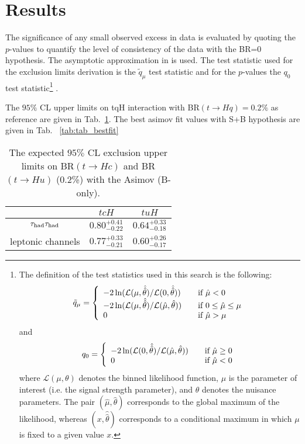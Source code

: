 \section{Results}
\label{sec:results}

The significance of any small observed excess in data is evaluated by quoting the $p$-values to quantify the level of consistency of the data with the BR=0 hypothesis. The asymptotic approximation in \cite{CCGV} is used. The test statistic used for the exclusion limits derivation is the $\tilde{q}_\mu$ test statistic
and for the $p$-values the $q_{0}$ test statistic\footnote{The definition of the test statistics used in this search is the following:
\[ \tilde q_\mu = \left\{
  \begin{array}{l l}
    -2 \ln (\mathcal{L}(\mu,\hat{\hat{\theta}})/\mathcal{L}(0,\hat{\hat\theta})) & \quad \text{if $\hat\mu < 0$}\\
    -2 \ln (\mathcal{L}(\mu,\hat{\hat{\theta}})/\mathcal{L}(\hat \mu,\hat\theta)) & \quad \text{if $0 \leq \hat\mu \leq \mu$}\\
    0 & \quad \text{if $\hat\mu > \mu$}
  \end{array} \right.\]
and
\[ q_0 = \left\{
  \begin{array}{l l}
    -2 \ln (\mathcal{L}(0,\hat{\hat{\theta}})/\mathcal{L}(\hat\mu,\hat\theta)) &\quad \text{if $\hat\mu \geq 0$}\\
    0 & \quad \text{if $\hat\mu <0$}
  \end{array} \right.\]
where $\mathcal L(\mu,\theta)$ denotes the binned likelihood function, $\mu$ is the parameter of interest (i.e.
the signal strength parameter), and $\theta$ denotes the nuisance parameters. The pair $(\hat\mu, \hat\theta)$
corresponds to the global maximum of the likelihood, whereas $(x, \hat{\hat\theta})$ corresponds to a conditional
maximum in which $\mu$ is fixed to a given value $x$.
}
\cite{CCGV}.

The $95\%$ CL upper limits on tqH interaction with BR$(t\to Hq)=0.2\%$ as reference are given in Tab.~\ref{tab:tab_limit}. The best asimov fit values with S+B hypothesis are given in Tab. ~\ref{tab:tab_bestfit}



\begin{table}[htb]
\caption{ The expected $95\%$ CL exclusion upper limits on BR$(t\to Hc)$ and BR$(t\to Hu)$ (0.2\%) with the Asimov (B-only).}
\centering
\begin{tabular}{|c|c|c|} \hline
  & $tcH$ & $tuH$ \\ \hline
  $\tau_\text{had}{}\tau_\text{had}$ & $0.80^{+0.41}_{-0.22}$ & $0.64^{+0.33}_{-0.18}$ \\ \hline
  leptonic channels & $0.77^{+0.33}_{-0.21}$ & $0.60^{+0.26}_{-0.17}$ \\ \hline

\end{tabular}
\label{tab:tab_limit}
\end{table}

